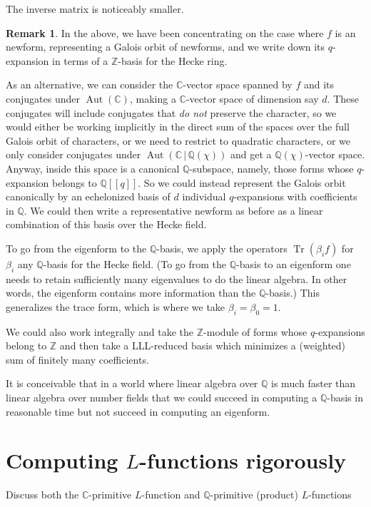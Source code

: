 \documentclass[11pt]{amsart}
\numberwithin{equation}{subsection}
\theoremstyle{plain}
\theoremstyle{definition}
\newtheorem{rmk}[equation]{Remark}
\newcommand{\Q}{\mathbb{Q}}
\newcommand{\Z}{\mathbb{Z}}
\newcommand{\C}{\mathbb{C}}
\DeclareMathOperator{\Aut}{Aut}
\DeclareMathOperator{\Tr}{Tr}
\begin{document}
The inverse matrix is noticeably smaller.  

\begin{rmk}
In the above, we have been concentrating on the case where $f$ is an newform, representing a Galois orbit of newforms, and we write down its $q$-expansion in terms of a $\Z$-basis for the Hecke ring.  

As an alternative, we can consider the $\C$-vector space spanned by $f$ and its conjugates under $\Aut(\C)$, making a $\C$-vector space of dimension say $d$.  These conjugates will include conjugates that \emph{do not} preserve the character, so we would either be working implicitly in the direct sum of the spaces over the full Galois orbit of characters, or we need to restrict to quadratic characters, or we only consider conjugates under $\Aut(\C\,|\,\Q(\chi))$ and get a $\Q(\chi)$-vector space.  Anyway, inside this space is a canonical $\Q$-subspace, namely, those forms whose $q$-expansion belongs to $\Q[[q]]$.  So we could instead represent the Galois orbit canonically by an echelonized basis of $d$ individual $q$-expansions with coefficients in $\Q$.  We could then write a representative newform as before as a linear combination of this basis over the Hecke field.

To go from the eigenform to the $\Q$-basis, we apply the operators $\Tr(\beta_i f)$ for $\beta_i$ any $\Q$-basis for the Hecke field.  (To go from the $\Q$-basis to an eigenform one needs to retain sufficiently many eigenvalues to do the linear algebra.  In other words, the eigenform contains more information than the $\Q$-basis.)  This generalizes the trace form, which is where we take $\beta_i=\beta_0=1$.  

We could also work integrally and take the $\Z$-module of forms whose $q$-expansions belong to $\Z$ and then take a LLL-reduced basis which minimizes a (weighted) sum of finitely many coefficients.  

It is conceivable that in a world where linear algebra over $\Q$ is much faster than linear algebra over number fields that we could succeed in computing a $\Q$-basis in reasonable time but not succeed in computing an eigenform.  
\end{rmk}

\section{Computing $L$-functions rigorously} \label{sec:Lfunctions}

Discuss both the $\C$-primitive $L$-function and $\Q$-primitive (product) $L$-functions
\end{document}
